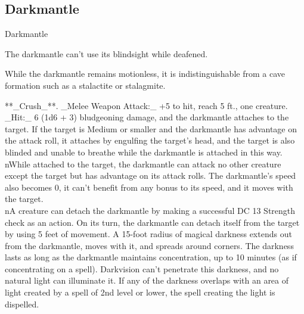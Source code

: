 \subsection{Darkmantle}
\begin{DndMonster}[float=*b,width\textwidth + 8pt]{Darkmantle}
\begin{multicols}{2}
\DndMonsterBasics[armor-class={11}, hit-points={22 (5d6 + 5)}, speed={10 ft., fly 30 ft.}]
\DndMonsterDetails[saving-throws={}, skills={Stealth +3}, damage-immunities={}, damage-resistances={}, damage-vulnerabilities={}, condition-immunities={}, senses={blindsight 60 ft., passive Perception 10}, languages={—}, challenge={1/2 (100 XP)}]
 The darkmantle can’t use its blindsight while deafened.

 While the darkmantle remains motionless, it is indistinguishable from a cave formation such as a stalactite or stalagmite.

**_Crush_**. _Melee Weapon Attack:_ +5 to hit, reach 5 ft., one creature. _Hit:_ 6 (1d6 + 3) bludgeoning damage, and the darkmantle attaches to the target. If the target is Medium or smaller and the darkmantle has advantage on the attack roll, it attaches by engulfing the target’s head, and the target is also blinded and unable to breathe while the darkmantle is attached in this way.\\nWhile attached to the target, the darkmantle can attack no other creature except the target but has advantage on its attack rolls. The darkmantle’s speed also becomes 0, it can’t benefit from any bonus to its speed, and it moves with the target.\\nA creature can detach the darkmantle by making a successful DC 13 Strength check as an action. On its turn, the darkmantle can detach itself from the target by using 5 feet of movement.
A 15-foot radius of magical darkness extends out from the darkmantle, moves with it, and spreads around corners. The darkness lasts as long as the darkmantle maintains concentration, up to 10 minutes (as if concentrating on a spell). Darkvision can’t penetrate this darkness, and no natural light can illuminate it. If any of the darkness overlaps with an area of light created by a spell of 2nd level or lower, the spell creating the light is dispelled.
\end{multicols}
\end{DndMonster}
